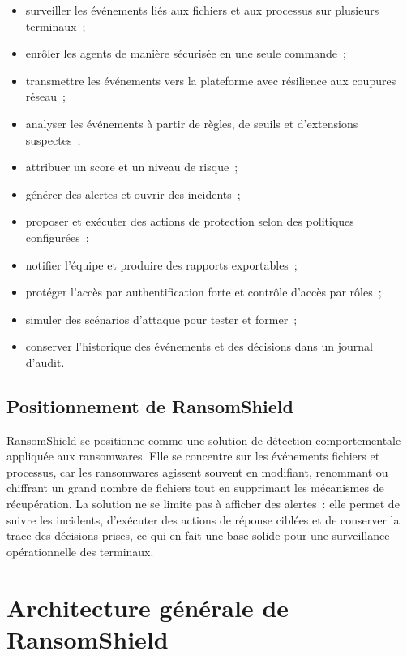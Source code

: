 \begin{itemize}
    \item surveiller les événements liés aux fichiers et aux processus sur plusieurs terminaux~;
    \item enrôler les agents de manière sécurisée en une seule commande~;
    \item transmettre les événements vers la plateforme avec résilience aux coupures réseau~;
    \item analyser les événements à partir de règles, de seuils et d'extensions suspectes~;
    \item attribuer un score et un niveau de risque~;
    \item générer des alertes et ouvrir des incidents~;
    \item proposer et exécuter des actions de protection selon des politiques configurées~;
    \item notifier l'équipe et produire des rapports exportables~;
    \item protéger l'accès par authentification forte et contrôle d'accès par rôles~;
    \item simuler des scénarios d'attaque pour tester et former~;
    \item conserver l'historique des événements et des décisions dans un journal d'audit.
\end{itemize}

\subsection{Positionnement de RansomShield}

RansomShield se positionne comme une solution de détection comportementale appliquée aux ransomwares. Elle se concentre sur les événements fichiers et processus, car les ransomwares agissent souvent en modifiant, renommant ou chiffrant un grand nombre de fichiers tout en supprimant les mécanismes de récupération. La solution ne se limite pas à afficher des alertes~: elle permet de suivre les incidents, d'exécuter des actions de réponse ciblées et de conserver la trace des décisions prises, ce qui en fait une base solide pour une surveillance opérationnelle des terminaux.

\section{Architecture générale de RansomShield}

